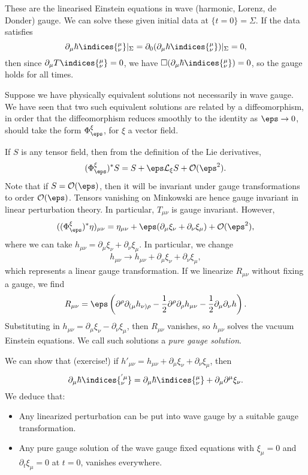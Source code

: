 \documentclass[12pt]{article}
\begin{document}
These are the linearised Einstein equations in wave (harmonic, Lorenz, de Donder) gauge. We can solve these given initial data at $\{t = 0\} = \Sigma$. If the data satisfies
\[
\partial_\mu \hbar\indices{^{\mu}_{\nu}} |_\Sigma = \partial_0(\partial_\mu \hbar\indices{^{\mu}_{\nu}})|_\Sigma = 0,
\]
then since $\partial_\mu T\indices{^{\mu}_{\nu}} = 0$, we have $\square (\partial_\mu \hbar\indices{^{\mu}_{\nu}}) = 0$, so the gauge holds for all times.

Suppose we have physically equivalent solutions not necessarily in wave gauge. We have seen that two such equivalent solutions are related by a diffeomorphism, in order that the diffeomorphism reduces smoothly to the identity as $\eps \to 0$, should take the form $\Phi^{\xi}_\eps$, for $\xi$ a vector field.

If $S$ is any tensor field, then from the definition of the Lie derivatives,
\[
	(\Phi^{\xi}_\eps)^{\ast} S = S + \eps \mathcal{L}_\xi S + \mathcal{O}(\eps^2).
\]
Note that if $S = \mathcal{O}(\eps)$, then it will be invariant under gauge transformations to order $\mathcal{O}(\eps)$. Tensors vanishing on Minkowski are hence gauge invariant in linear perturbation theory. In particular, $T_{\mu\nu}$ is gauge invariant. However,
\[
	((\Phi^\xi_\eps)^{\ast} \eta)_{\mu\nu} = \eta_{\mu\nu} + \eps (\partial_\mu \xi_\nu + \partial_\nu \xi_\mu) + \mathcal{O}(\eps ^2),
\]
where we can take $h_{\mu\nu} = \partial_\mu \xi_\nu + \partial_\nu \xi_\mu$. In particular, we change
\[
h_{\mu\nu} \to h_{\mu\nu} + \partial_\mu \xi_\nu + \partial_\nu \xi_\mu,
\]
which represents a linear gauge transformation. If we linearize $R_{\mu\nu}$ without fixing a gauge, we find
\[
R_{\mu\nu} = \eps\left(\partial^\rho \partial_{(\mu} h_{\nu)\rho} - \frac{1}{2} \partial^\rho \partial_\rho h_{\mu\nu} - \frac 12 \partial_\mu \partial_\nu h \right).
\]
Substituting in $h_{\mu\nu} = \partial_\mu \xi_\nu - \partial_\nu \xi_\mu$, then $R_{\mu\nu}$ vanishes, so $h_{\mu\nu}$ solves the vacuum Einstein equations. We call such solutions a \emph{pure gauge solution}.

We can show that (exercise!) if $h'_{\mu\nu} = h_{\mu\nu} + \partial_\mu \xi_\nu + \partial_\nu \xi_\mu$, then
\[
\partial_\mu \hbar\indices{^{'\mu}_{\nu}} = \partial_\mu \hbar\indices{^{\mu}_{\nu}} + \partial_\mu \partial^\mu \xi_\nu.
\]
We deduce that:
\begin{itemize}
	\item Any linearized perturbation can be put into wave gauge by a suitable gauge transformation.
	\item Any pure gauge solution of the wave gauge fixed equations with $\xi_\mu = 0$ and $\partial_t \xi_\mu = 0$ at $t = 0$, vanishes everywhere.
\end{itemize}
\end{document}

